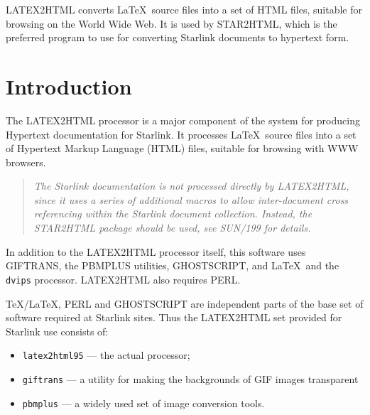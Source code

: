 \documentclass[twoside,11pt]{article}
\newcommand{\stardocinitials}  {SUN}
\newcommand{\stardocnumber}    {201.1}
\newcommand{\stardocabstract}  {LATEX2HTML converts \LaTeX\ source files
into a set of HTML files, suitable for browsing on the World Wide Web.
It is used by STAR2HTML, which is the preferred program to use for
converting Starlink documents to hypertext form.}
\newcommand{\stardocname}{\stardocinitials /\stardocnumber}
\newenvironment{latexonly}{}{}
\newcommand{\xref}[3]{#1}
\newcommand{\xlabel}[1]{}
\renewcommand{\thepage}{\roman{page}}
\begin{document}
\stardocabstract
\newpage
\begin{latexonly}
   \setlength{\parskip}{0mm}
   \tableofcontents
   \setlength{\parskip}{\medskipamount}
   \markright{\stardocname}
\end{latexonly}
\newpage
\renewcommand{\thepage}{\arabic{page}}
\setcounter{page}{1}

\section{Introduction\xlabel{introduction}}

The LATEX2HTML processor is a major component of the system for producing
Hypertext documentation for Starlink.  It processes \LaTeX\ source files
into a set of Hypertext Markup Language (HTML) files, suitable for browsing
with WWW browsers.

\begin{quote}
{\em The Starlink documentation is not processed directly by LATEX2HTML,
since it uses a series of additional macros to allow inter-document
cross referencing within the Starlink document collection.  Instead,
the STAR2HTML package should be used, see \xref{SUN/199}{sun199}{} for details.}
\end{quote}

In addition to the LATEX2HTML processor itself, this software uses
GIFTRANS, the PBMPLUS utilities, GHOSTSCRIPT, and \LaTeX\ and the {\tt
dvips} processor.  LATEX2HTML also requires PERL.

\TeX/\LaTeX, PERL and GHOSTSCRIPT are independent parts of the base set
of software required at Starlink sites.  Thus the LATEX2HTML set provided for
Starlink use consists of:

\begin{itemize}

\item {\tt latex2html95} --- the actual processor;

\item {\tt giftrans} --- a utility for making the backgrounds of GIF
images transparent

\item {\tt pbmplus} --- a widely used set of image conversion tools.

\end{itemize}
\end{document}
